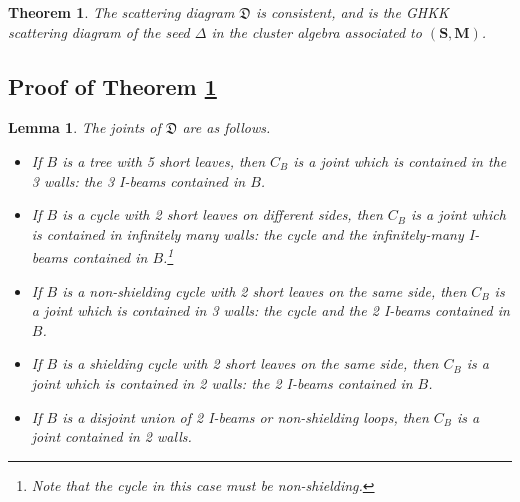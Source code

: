 \documentclass{amsart}
\newtheorem{theorem}[proposition]{Theorem}
\newtheorem{lemma}[proposition]{Lemma}
\theoremstyle{definition}
\theoremstyle{remark}
\numberwithin{equation}{section}
\newcommand{\0}{{\mathbf{0}}}
\newcommand{\M}{\mathbf{M}}
\renewcommand{\S}{\mathbf{S}}
\begin{document}
\begin{theorem}\label{thm: consistent}
The scattering diagram $\mathfrak{D}$ is consistent, and is the GHKK scattering diagram of the seed $\Delta$ in the cluster algebra associated to $(\S,\M)$.
\end{theorem}

\subsection{Proof of Theorem \ref{thm: consistent}}

\begin{lemma}
The joints of $\mathfrak{D}$ are as follows.%
\begin{itemize}
	\item If $B$ is a tree with 5 short leaves, then $C_B$ is a joint which is contained in the 3 walls: the 3 I-beams contained in $B$.
	\item If $B$ is a cycle with 2 short leaves on different sides, then $C_B$ is a joint which is contained in infinitely many walls: the cycle and the infinitely-many I-beams contained in $B$.\footnote{Note that the cycle in this case must be non-shielding.}
	\item If $B$ is a non-shielding cycle with 2 short leaves on the same side, then $C_B$ is a joint which is contained in 3 walls: the cycle and the 2 I-beams contained in $B$.
	\item If $B$ is a shielding cycle with 2 short leaves on the same side, then $C_B$ is a joint which is contained in 2 walls: the 2 I-beams contained in $B$.
	\item If $B$ is a disjoint union of 2 I-beams or non-shielding loops, then $C_B$ is a joint contained in 2 walls.
\end{itemize}
\end{lemma}
\end{document}
